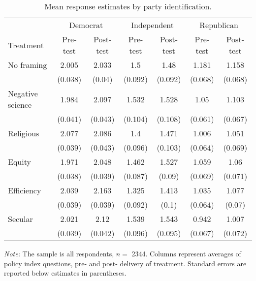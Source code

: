 \begin{table*}

\caption{Mean response estimates by party identification. \label{tab:party_means}}
\centering
\begin{threeparttable}
\begin{tabular}[t]{lcccccc}
\toprule
\multicolumn{1}{c}{ } & \multicolumn{2}{c}{Democrat} & \multicolumn{2}{c}{Independent} & \multicolumn{2}{c}{Republican} \\
Treatment & Pre-test & Post-test & Pre-test & Post-test & Pre-test & Post-test\\
\cmidrule(lr){2-3} \cmidrule(lr){4-5} \cmidrule(lr){6-7}
No framing & \num{2.005} & \num{2.033} & \num{1.5} & \num{1.48} & \num{1.181} & \num{1.158}\\
 & (\num{0.038}) & (\num{0.04}) & (\num{0.092}) & (\num{0.092}) & (\num{0.068}) & (\num{0.068})\\
\addlinespace
Negative science & \num{1.984} & \num{2.097} & \num{1.532} & \num{1.528} & \num{1.05} & \num{1.103}\\
 & (\num{0.041}) & (\num{0.043}) & (\num{0.104}) & (\num{0.108}) & (\num{0.061}) & (\num{0.067})\\
\addlinespace
Religious & \num{2.077} & \num{2.086} & \num{1.4} & \num{1.471} & \num{1.006} & \num{1.051}\\
 & (\num{0.039}) & (\num{0.043}) & (\num{0.096}) & (\num{0.103}) & (\num{0.064}) & (\num{0.069})\\
\addlinespace
Equity & \num{1.971} & \num{2.048} & \num{1.462} & \num{1.527} & \num{1.059} & \num{1.06}\\
 & (\num{0.038}) & (\num{0.039}) & (\num{0.087}) & (\num{0.09}) & (\num{0.069}) & (\num{0.071})\\
\addlinespace
Efficiency & \num{2.039} & \num{2.163} & \num{1.325} & \num{1.413} & \num{1.035} & \num{1.077}\\
 & (\num{0.039}) & (\num{0.039}) & (\num{0.092}) & (\num{0.1}) & (\num{0.064}) & (\num{0.07})\\
\addlinespace
Secular & \num{2.021} & \num{2.12} & \num{1.539} & \num{1.543} & \num{0.942} & \num{1.007}\\
 & (\num{0.039}) & (\num{0.042}) & (\num{0.096}) & (\num{0.095}) & (\num{0.067}) & (\num{0.072})\\
\bottomrule
\end{tabular}
\begin{tablenotes}
\item \footnotesize \textit{Note:} The sample is all respondents, $n = $ \num{2344}. Columns represent averages of policy index questions, pre- and post- delivery of treatment. Standard errors are reported below estimates in parentheses.
\end{tablenotes}
\end{threeparttable}
\end{table*}
